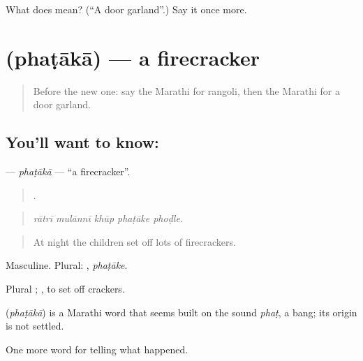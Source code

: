 \begin{tcolorbox}[breakable,colback=teal!4,colframe=teal!35!black,title={Before you move on}]
What does  mean? (\textquotedblleft{}A door garland\textquotedblright{}.) Say it once more.
\end{tcolorbox}
\section[\texorpdfstring{\mr{फटाका} (phaṭākā)}{फटाका (phaṭākā)}]{ (phaṭākā) — a firecracker}

\label{lesson:MR-C319-phataka}



\begin{quote}
Before the new one: say the Marathi for rangoli, then the Marathi for a door garland.
\end{quote}

\subsection*{You'll want to know: }
\textbf{} — \emph{phaṭākā} — \textquotedblleft{}a firecracker\textquotedblright{}.

\begin{quote}
    .
\end{quote}

\begin{quote}
\emph{rātrī mulānnī khūp phaṭāke phoḍle.}
\end{quote}

\begin{quote}
At night the children set off lots of firecrackers.
\end{quote}

Masculine. Plural: , \emph{phaṭāke}.

Plural ;  , to set off crackers.

\begin{cousinweb}
\textbf{} (\emph{phaṭākā}) is a Marathi word that seems built on the sound \emph{phaṭ}, a bang; its origin is not settled.
\end{cousinweb}

\begin{grammarlens}[title={What you've built}]
One more word for telling what happened.
\end{grammarlens}

